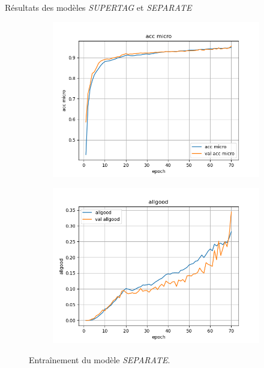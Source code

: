\documentclass[11pt]{beamer}
\begin{document}
\begin{frame}{Résultats des modèles \textit{SUPERTAG} et \textit{SEPARATE}}
\begin{figure}
\begin{subfigure}{0.32\textwidth}
            \includegraphics[width=\linewidth]{../logs/separate/acc micro.png}
        \end{subfigure}
        \begin{subfigure}{0.32\textwidth}
            \centering
            \includegraphics[width=\linewidth]{../logs/separate/allgood.png}
        \end{subfigure}
        \caption{Entraînement du modèle \textit{SEPARATE}.}
        \label{fig: results separate}
    \end{figure}
\end{frame}
\end{document}

